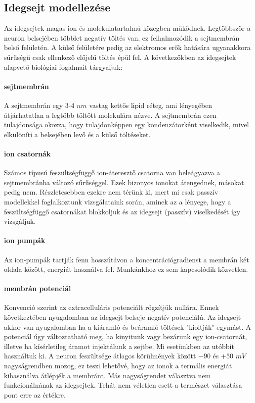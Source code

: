 \FloatBarrier
\subsection{Idegsejt modellezése}
Az idegsejtek magas ion és molekulatartalmú közegben működnek. Legtöbbször a neuron belsejében többlet negatív töltés van, ez felhalmozódik a sejtmembrán belső felületén. A külső felületére pedig az elektromos erők hatására ugyanakkora sűrűségű csak ellenkező előjelű töltés épül fel. A következőkben az idegsejtek alapvető biológiai fogalmait tárgyaljuk:

\paragraph{sejtmembrán}
A sejtmembrán egy 3-4 $nm$ vastag kettős lipid réteg, ami lényegében átjárhatatlan a legtöbb töltött molekulára nézve. A sejtmembrán ezen tulajdonsága okozza, hogy tulajdonképpen egy kondenzátorként viselkedik, mivel elkülöníti a belsejében levő és a külső töltéseket.

\paragraph{ion csatornák}
Számos típusú feszültségfüggő ion-áteresztő csatorna van beleágyazva a sejtmembránba változó sűrűséggel. Ezek bizonyos ionokat átengednek, másokat pedig nem. Részletesebben ezekre nem térünk ki, mert mi csak passzív modellekkel foglalkoztunk vizsgálataink során, aminek az a lényege, hogy a feszültségfüggő csatornákat blokkoljuk és az idegsejt (passzív) viselkedését így vizsgáljuk.

\paragraph{ion pumpák}
Az ion-pumpák tartják fenn hosszútávon a koncentrációgradienst a membrán két oldala között, energiát használva fel. Munkánkhoz ez sem kapcsolódik közvetlen.

\paragraph{membrán potenciál}
Konvenció szerint az extracelluláris potenciált rögzítjük nullára. Ennek következtében nyugalomban az idegsejt belseje negatív potenciálú. Az idegsejt akkor van nyugalomban ha a kiáramló és beáramló töltések "kioltják" egymást. A potenciál úgy változtatható meg, ha kinyitunk vagy bezárunk egy ion-csatornát, illetve ha kísérletileg áramot injektálunk a sejtbe. Mi esetünkben az utóbbit használtuk ki.
A neuron feszültsége átlagos körülmények között $-90$ és $+50$ $mV$ nagyságrendben mozog, ez teszi lehetővé, hogy az ionok a termális energiát kihasználva átlépjék a membránt. Más nagyságrendet választva nem funkcionálnának az idegsejtek. Tehát nem véletlen esett a természet választása pont erre az értékre.

